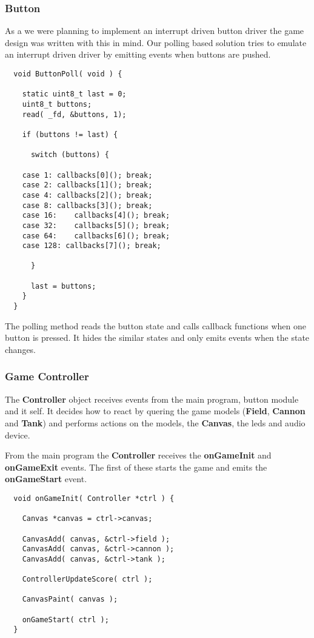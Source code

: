 \subsubsection{Button}
As a we were planning to implement an interrupt driven button driver the game design
was written with this in mind. Our polling based solution tries to emulate an interrupt
driven driver by emitting events when buttons are pushed.

\begin{lstlisting}
  void ButtonPoll( void ) {

    static uint8_t last = 0;
    uint8_t buttons;
    read( _fd, &buttons, 1);

    if (buttons != last) {

      switch (buttons) {

	case 1:	callbacks[0](); break;
	case 2:	callbacks[1](); break;
	case 4:	callbacks[2](); break;
	case 8:	callbacks[3](); break;
	case 16:	callbacks[4](); break;
	case 32:	callbacks[5](); break;
	case 64:	callbacks[6](); break;
	case 128: callbacks[7](); break;

      }

      last = buttons;
    }
  }
\end{lstlisting}
The polling method reads the button state and calls callback functions when one button
is pressed. It hides the similar states and only emits events when the state changes.

\subsubsection{Game Controller}
The {\bf Controller} object receives events from the main program, button module and it self.
It decides how to react by quering the game models ({\bf Field}, {\bf Cannon} and {\bf Tank})
and performs actions on the models, the {\bf Canvas}, the leds and audio device.

From the main program the {\bf Controller} receives the {\bf onGameInit} and {\bf onGameExit} events.
The first of these starts the game and emits the {\bf onGameStart} event.
\begin{lstlisting}
  void onGameInit( Controller *ctrl ) {

    Canvas *canvas = ctrl->canvas;

    CanvasAdd( canvas, &ctrl->field );
    CanvasAdd( canvas, &ctrl->cannon );
    CanvasAdd( canvas, &ctrl->tank );

    ControllerUpdateScore( ctrl );

    CanvasPaint( canvas );

    onGameStart( ctrl );
  }
\end{lstlisting}

